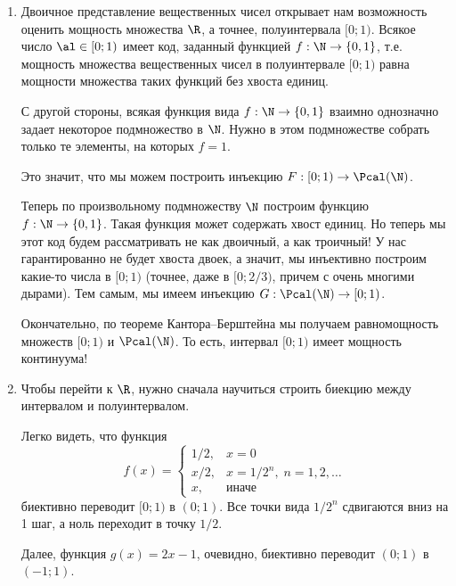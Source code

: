 \begin{enumerate}
\lesson{Мощность множества $\R$. Двоичные дроби интервала $[0;1)$ и $2^\N$. Биекция из $\R$ в $[0;1)$}


\item Двоичное представление вещественных чисел открывает нам возможность оценить мощность множества $\R$, а точнее, полуинтервала $[0;1)$. Всякое число $\al\in[0;1)$ имеет код, заданный функцией $f:\N\to\{0,1\}$, т.е. мощность множества вещественных чисел в полуинтервале $[0;1)$ равна мощности множества таких функций без хвоста единиц.

С другой стороны, всякая функция вида $f:\N\to\{0,1\}$ взаимно однозначно задает некоторое подмножество в $\N$. Нужно в этом подмножестве собрать только те элементы, на которых $f=1$.

Это значит, что мы можем построить инъекцию $F:[0;1)\to\Pcal(\N)$.

Теперь по произвольному подмножеству $\N$ построим функцию $f:\N\to\{0,1\}$. Такая функция может содержать хвост единиц. Но теперь мы этот код будем рассматривать не как двоичный, а как троичный! У нас гарантированно не будет хвоста двоек, а значит, мы инъективно построим какие-то числа в $[0;1)$ (точнее, даже в $[0;2/3)$, причем с очень многими дырами). Тем самым, мы имеем инъекцию $G:\Pcal(\N)\to[0;1)$.

Окончательно, по теореме Кантора--Берштейна мы получаем равномощность множеств $[0;1)$ и $\Pcal(\N)$. То есть, интервал $[0;1)$ имеет мощность континуума!
\item Чтобы перейти к $\R$, нужно сначала научиться строить биекцию между интервалом и полуинтервалом.

Легко видеть, что функция
$$
f(x) = \begin{cases}
1/2, & x=0 \\
x/2, & x=1/2^n,\; n=1,2,\dots \\
x, & \mbox{иначе}
\end{cases}
$$
биективно переводит $[0;1)$ в $(0;1)$. Все точки вида $1/2^n$ сдвигаются вниз на 1 шаг, а ноль переходит в точку $1/2$.

Далее, функция $g(x)=2x-1$, очевидно, биективно переводит $(0;1)$ в $(-1;1)$.


\end{enumerate}

